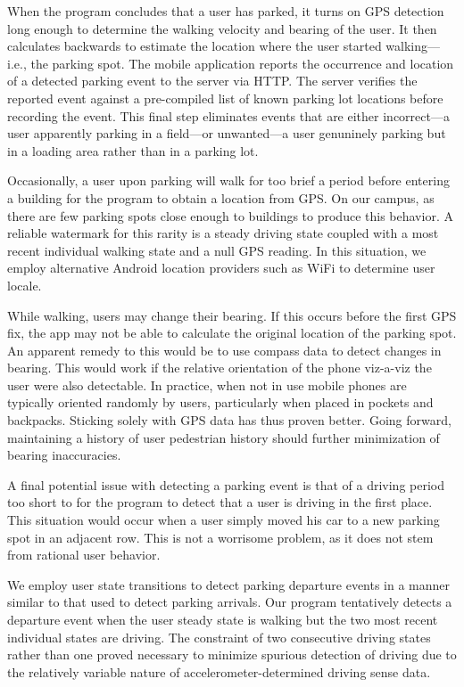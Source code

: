 When the program concludes that a user has parked, it turns on GPS detection
long enough to determine the walking velocity and bearing of the user. It
then calculates backwards to estimate the location where the user started
walking---i.e., the parking spot. The mobile application reports the
occurrence and location of a detected parking event to the server via HTTP.
The server verifies the reported event against a pre-compiled list of known
parking lot locations before recording the event. This final step eliminates
events that are either incorrect---a user apparently parking in a field---or
unwanted---a user genuninely parking but in a loading area rather than in a
parking lot.

Occasionally, a user upon parking will walk for too brief a period before
entering a building for the program to obtain a location from GPS. On our
campus, as there are few parking spots close enough to buildings to produce
this behavior. A reliable watermark for this rarity is a steady driving state
coupled with a most recent individual walking state and a null GPS reading.
In this situation, we employ alternative Android location providers such as
WiFi to determine user locale.

While walking, users may change their bearing. If this occurs before the
first GPS fix, the app may not be able to calculate the original location of
the parking spot. An apparent remedy to this would be to use compass data to
detect changes in bearing. This would work if the relative orientation of the
phone viz-a-viz the user were also detectable. In practice, when not in use
mobile phones are typically oriented randomly by users, particularly when
placed in pockets and backpacks. Sticking solely with GPS data has thus
proven better. Going forward, maintaining a history of user pedestrian
history should further minimization of bearing inaccuracies.

A final potential issue with detecting a parking event is that of a driving
period too short to for the program to detect that a user is driving in the
first place. This situation would occur when a user simply moved his car to a
new parking spot in an adjacent row. This is not a worrisome problem, as it
does not stem from rational user behavior.

We employ user state transitions to detect parking departure events in a
manner similar to that used to detect parking arrivals. Our program
tentatively detects a departure event when the user steady state is walking
but the two most recent individual states are driving. The constraint of two
consecutive driving states rather than one proved necessary to minimize
spurious detection of driving due to the relatively variable nature of
accelerometer-determined driving sense data.

